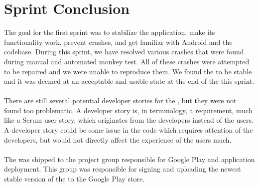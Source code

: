 
\chapter{Sprint Conclusion}
\label{cha:conclusion_sprint_1}

The goal for the first sprint was to stabilize the \launcher application, make its functionality work, prevent crashes, and get familiar with Android and the codebase. During this sprint, we have resolved various crashes that were found during manual and automated monkey test. All of these crashes were attempted to be repaired and we were unable to reproduce them. We found the \launcher to be stable and it was deemed at an acceptable and usable state at the end of the this sprint.
\\\\
There are still several potential developer stories for the \launcher, but they were not found too problematic. A developer story is, in \giraf terminology, a requirement, much like a Scrum user story, which originates from the developers instead of the users. A developer story could be some issue in the code which requires attention of the developers, but would not directly affect the experience of the users much. 
\\\\
The \launcher was shipped to the project group responsible for Google Play and application deployment. This group was responsible for signing  and uploading the newest stable version of the \launcher to the Google Play store.